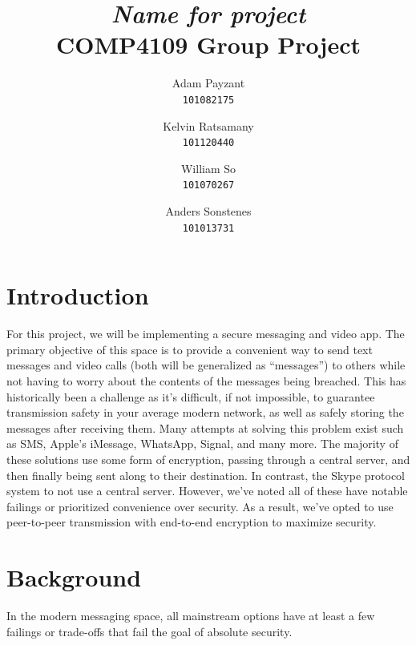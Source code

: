\documentclass[titlepage]{article}
\title{\textit{Name for project} \\
    \large COMP4109 Group Project
}
\author{Adam Payzant \\
    \texttt{101082175} \\
    \and
    Kelvin Ratsamany \\
    \texttt{101120440}
    \and
    William So \\
    \texttt{101070267} \\
    \and
    Anders Sonstenes \\
    \texttt{101013731}
}
\begin{document}
    \maketitle

    \section{Introduction}

      For this project, we will be implementing a secure messaging and video app.
      The primary objective of this space is to provide a convenient way to send text messages and video calls (both will be generalized as ``messages'') to others while not having to worry about the contents of the messages being breached.
      This has historically been a challenge as it's difficult, if not impossible, to guarantee transmission safety in your average modern network, as well as safely storing the messages after receiving them.
      Many attempts at solving this problem exist such as SMS, Apple's iMessage, WhatsApp, Signal, and many more.
      The majority of these solutions use some form of encryption, passing through a central server, and then finally being sent along to their destination.
      In contrast, the Skype protocol system to not use a central server.
      However, we've noted all of these have notable failings or prioritized convenience over security.
      As a result, we've opted to use peer-to-peer transmission with end-to-end encryption to maximize security.

    \section{Background}

      In the modern messaging space, all mainstream options have at least a few failings or trade-offs that fail the goal of absolute security.
\end{document}
